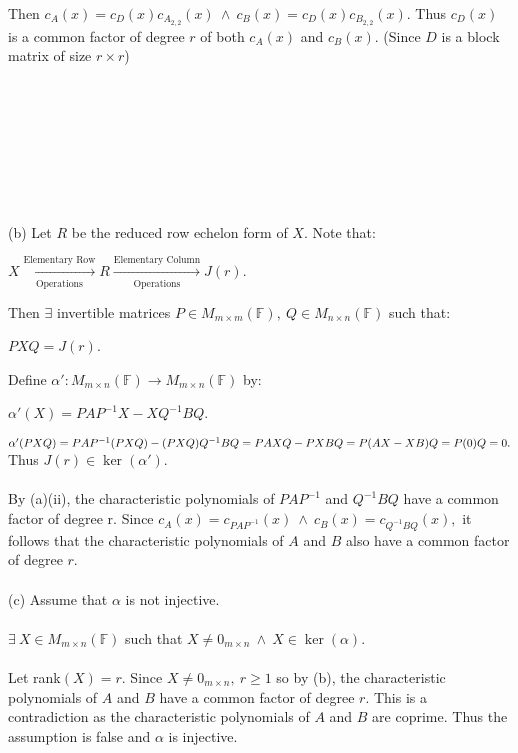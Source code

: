 \documentclass{article}
\begin{document}
Then $c_A(x) = c_D(x)c_{A_{2,2}}(x)\ \land\ c_B(x) = c_D(x)c_{B_{2,2}}(x).$ Thus $c_D(x)$ is a common factor of degree $r$ of both $c_A(x)$ and $c_B(x).$ (Since $D$ is a block matrix of size $r \times r$)
\\\\\\\\\\\\\\\\\\
(b) Let $R$ be the reduced row echelon form of $X$. Note that:\begin{center}
$X \xrightarrow[\text{Operations}]{\text{Elementary Row}} R \xrightarrow[\text{Operations}]{\text{Elementary Column}} J(r)$.
\end{center}
Then $\exists $ invertible matrices $P\in M_{m\times m}(\mathbb{F}),\ Q\in M_{n\times n}(\mathbb{F})$ such that:\begin{center}
$PXQ = J(r)$. 
\end{center}
Define $\alpha': M_{m\times n}(\mathbb{F}) \to M_{m\times n} (\mathbb{F})$ by:\begin{center}
    $\alpha'(X) = PAP^{-1}X - XQ^{-1}BQ$. 
\end{center}
$\alpha'(PXQ) = PAP^{-1}(PXQ) - (PXQ)Q^{-1}BQ = PAXQ - PXBQ\\= P(AX-XB)Q = P(0)Q = 0.$ Thus $J(r)\in \ker(\alpha')$.\\\\ By (a)(ii), the characteristic polynomials of $PAP^{-1}$ and $Q^{-1}BQ$ have a common factor of degree r. Since $c_A(x) = c_{PAP^{-1}}(x) \ \land \ c_B(x) = c_{Q^{-1}BQ}(x),$ it follows that the characteristic polynomials of $A$ and $B$ also have a common factor of degree $r$.\\\\
(c) Assume that $\alpha$ is not injective.\\\\ $\exists\ X \in M_{m\times n}(\mathbb{F})$ such that $X\neq 0_{m\times n}\ \land \ X\in \ker(\alpha).$\\\\ Let rank$(X) = r$. Since $X \neq 0_{m\times n},\ r \geq 1$ so by (b), the characteristic polynomials of $A$ and $B$ have a common factor of degree $r$. This is a contradiction as the characteristic polynomials of $A$ and $B$ are coprime. Thus the assumption is false and $\alpha$ is injective.
\end{document}
